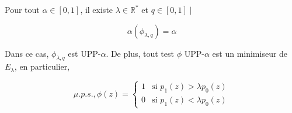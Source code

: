 \documentclass[12pt]{article}
\newif\ifcorrection
\newcommand{\corr}[1]{\ifcorrection{\color{lightblue}#1\color{black}}\fi}
\newcommand{\petitespace}{\vspace{0.5cm}}
\newcommand{\cercler}[1]{\tikz[baseline=(char.base)]{\node[shape=circle,draw,inner sep=1pt](char){#1};} }
\newcommand{\bb}[1]{\mathbb{#1}} %
\newcommand{\R}{\bb{R}} %
\newcommand{\ie}{\textit{i.e.}}
\newcommand{\Rq}{\underline{Remarque :} \\}
\newcommand{\Lim}[1]{\lim\limits_{#1}}
\newcommand{\1}{\bb{1}} %
\begin{document}
\cercler 1 Pour tout $\alpha \in [0,1]$, il existe $\lambda \in \R^*$ et $q \in [0,1] \mid$

$$   \alpha(\phi_{\lambda, q}) = \alpha  $$\petitespace


\cercler 2 Dans ce cas, $\phi_{\lambda, q}$ est UPP-$\alpha$. De plus, tout test $\phi$ UPP-$\alpha$ est un minimiseur de $E_\lambda$, en particulier, 

$$\mu.p.s., \phi(z) =  \begin{cases} 
1 & \text{si } p_1(z) > \lambda p_0(z) \\
0 & \text{si } p_1(z) < \lambda p_0(z)
\end{cases}$$

\petitespace

\corr{\textbf{Preuve :}\petitespace

\cercler 1 On pose $F : \R_+ \mapsto [0,1] \mid F(\lambda ) =P_0( p_1(Z) \le p_0(Z)\lambda ) = P_0(  \frac{p_1(Z)}{p_0(Z)} \le \lambda)$ 
\petitespace 


Alors $F$ est une fonction de répartition, donc $F$ est croisante, cadlàg, et telle que $\Lim{\lambda \to + \infty}F(\lambda) = 1$, $F(\lambda)=0$, si $\lambda <0$\petitespace

\Rq

\begin{align*}
	\alpha(\phi_{\lambda, q}) &= P_0(p_1(z) > p_0(z)\lambda)  + qP_0(p_1(z) = p_0(z)\lambda)\\
	&= 1-F(\lambda) + q(F(\lambda) - F(\lambda_-) )\\
	&\in [1-F(\lambda), 1-F(\lambda_-)]
\end{align*}


On pose $\lambda^* = \inf\{\lambda \in \R_+ : F(\lambda) \ge 1-\alpha \} < \infty$\petitespace

$F(\lambda) \underset{\lambda \to \infty}{\longrightarrow} 1 >1-\alpha$ Alors, par définition : $F(\lambda)<1-\alpha,\quad \forall \lambda<\lambda^*$\petitespace

Donc $F(\lambda_-^*) \le 1-\alpha $ \ie : $1-F(\lambda_-^*)\ge \alpha$. Par croissance de $F$, on a $F(\lambda)\ge 1-\alpha$ pour tout $\lambda > \lambda^*$\petitespace


Donc $F(\lambda^*) = \Lim{\underset{\lambda> \lambda^*}{\lambda \to \lambda^*}}F(\lambda)\ge 1- \alpha$ \ie :  $1-F(\lambda^*) \le \alpha$. On cherche $q \in [0,1]$ tel que 

$$\alpha(\phi_{\lambda^*,q}) = \alpha = 1-F(\lambda^*) + q(F(\lambda^*)-F(\lambda^*_-)) \iff q = \frac{\alpha-(1-F(\lambda))}{F(\lambda^*)-F(\lambda^*_-)}$$\petitespace


}
\end{document}

